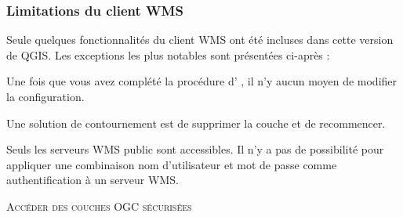 \subsubsection{Limitations du client
WMS}\label{sec:ogc-wms-limits}

Seule quelques fonctionnalités du client WMS ont été incluses dans cette
version de QGIS. Les exceptions les plus notables sont présentées ci-après :


Une fois que vous avez complété la procédure d'
, il n'y aucun moyen
de modifier la configuration.

Une solution de contournement est de supprimer la couche et de recommencer.


Seuls les serveurs WMS public sont accessibles.
Il n'y a pas de possibilité pour appliquer une combinaison nom d'utilisateur
et mot de passe comme authentification à un serveur WMS.

\begin{Astuce}[ht]\caption{\textsc{Accéder des couches OGC sécurisées}}
\end{Astuce}


